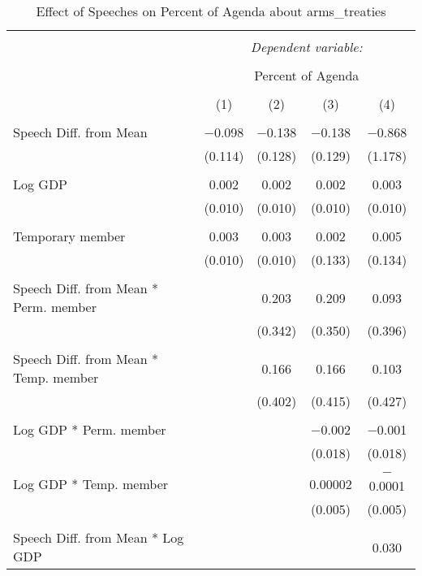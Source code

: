 
\begin{table}[!htbp] \centering 
  \caption{Effect of Speeches on Percent of Agenda about arms_treaties} 
  \label{} 
\begin{tabular}{@{\extracolsep{5pt}}lcccc} 
\\[-1.8ex]\hline 
\hline \\[-1.8ex] 
 & \multicolumn{4}{c}{\textit{Dependent variable:}} \\ 
\cline{2-5} 
\\[-1.8ex] & \multicolumn{4}{c}{Percent of Agenda} \\ 
\\[-1.8ex] & (1) & (2) & (3) & (4)\\ 
\hline \\[-1.8ex] 
 Speech Diff. from Mean & $-$0.098 & $-$0.138 & $-$0.138 & $-$0.868 \\ 
  & (0.114) & (0.128) & (0.129) & (1.178) \\ 
  & & & & \\ 
 Log GDP & 0.002 & 0.002 & 0.002 & 0.003 \\ 
  & (0.010) & (0.010) & (0.010) & (0.010) \\ 
  & & & & \\ 
 Temporary member & 0.003 & 0.003 & 0.002 & 0.005 \\ 
  & (0.010) & (0.010) & (0.133) & (0.134) \\ 
  & & & & \\ 
 Speech Diff. from Mean * Perm. member &  & 0.203 & 0.209 & 0.093 \\ 
  &  & (0.342) & (0.350) & (0.396) \\ 
  & & & & \\ 
 Speech Diff. from Mean * Temp. member &  & 0.166 & 0.166 & 0.103 \\ 
  &  & (0.402) & (0.415) & (0.427) \\ 
  & & & & \\ 
 Log GDP * Perm. member &  &  & $-$0.002 & $-$0.001 \\ 
  &  &  & (0.018) & (0.018) \\ 
  & & & & \\ 
 Log GDP * Temp. member &  &  & 0.00002 & $-$0.0001 \\ 
  &  &  & (0.005) & (0.005) \\ 
  & & & & \\ 
 Speech Diff. from Mean * Log GDP &  &  &  & 0.030 \\ 

\end{tabular}
\end{table}
